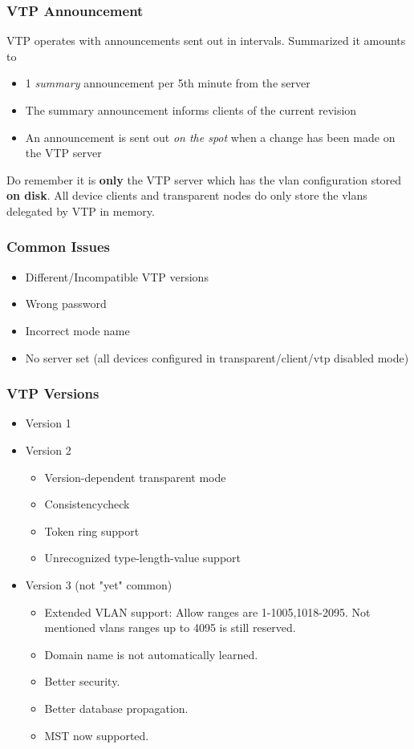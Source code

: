 \subsubsection{VTP Announcement}
VTP operates with announcements sent out in intervals. Summarized it amounts to
\begin{itemize}
    \item 1 \textit{summary} announcement per 5th minute from the server
    \item The summary announcement informs clients of the current revision
    \item An announcement is sent out \textit{on the spot} when a change has been made on the VTP server
\end{itemize}

Do remember it is \textbf{only} the VTP server which has the vlan configuration stored \textbf{on disk}. All device clients and transparent nodes do only store the vlans delegated by VTP in memory.

\subsubsection{Common Issues}
\begin{itemize}
    \item Different/Incompatible VTP versions
    \item Wrong password
    \item Incorrect mode name
    \item No server set (all devices configured in transparent/client/vtp disabled mode)
\end{itemize}

\subsubsection{VTP Versions}
\begin{itemize}
    \item Version 1
    \item Version 2
    \begin{itemize}
        \item Version-dependent	transparent	mode
        \item Consistencycheck
        \item Token ring support
        \item Unrecognized type-length-value support
    \end{itemize}
    \item Version 3 (not "yet" common)
    \begin{itemize}
        \item Extended VLAN support: Allow ranges are 1-1005,1018-2095. Not mentioned vlans ranges up to 4095 is still reserved.
        \item Domain name is not automatically learned.
        \item Better security.
        \item Better database propagation.
        \item MST now supported.
    \end{itemize}
\end{itemize}

